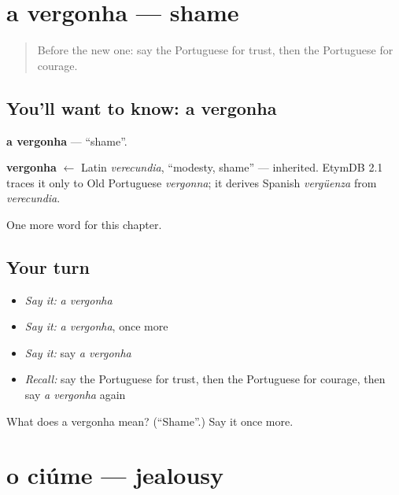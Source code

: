 \section[a vergonha]{a vergonha — shame}

\label{lesson:PT-C181-vergonha}



\begin{quote}
Before the new one: say the Portuguese for trust, then the Portuguese for courage.
\end{quote}

\subsection*{You'll want to know: a vergonha}
\textbf{a vergonha} — \textquotedblleft{}shame\textquotedblright{}.

\begin{cousinweb}
\textbf{vergonha} $\leftarrow$ Latin \emph{verecundia}, \textquotedblleft{}modesty, shame\textquotedblright{} — inherited. EtymDB 2.1 traces it only to Old Portuguese \emph{vergonna}; it derives Spanish \emph{vergüenza} from \emph{verecundia}.
\end{cousinweb}

\begin{grammarlens}[title={What you've built}]
One more word for this chapter.
\end{grammarlens}

\subsection*{Your turn}
\begin{itemize}
\raggedright
  \item \emph{Say it:} \emph{a vergonha}
  \item \emph{Say it:} \emph{a vergonha}, once more
  \item \emph{Say it:} say \emph{a vergonha}
  \item \emph{Recall:} say the Portuguese for trust, then the Portuguese for courage, then say \emph{a vergonha} again
\end{itemize}

\begin{tcolorbox}[breakable,colback=teal!4,colframe=teal!35!black,title={Before you move on}]
What does a vergonha mean? (\textquotedblleft{}Shame\textquotedblright{}.) Say it once more.
\end{tcolorbox}
\section[o ciúme]{o ciúme — jealousy}

